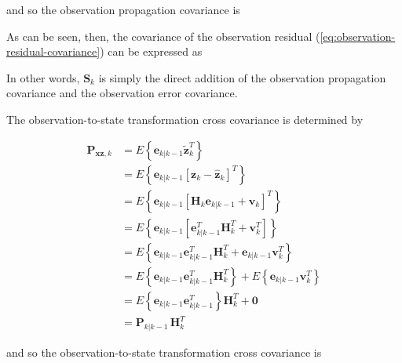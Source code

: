 \documentclass[12pt]{article}
\begin{document}
and so the observation propagation covariance is


As can be seen, then, the covariance of the observation residual (\ref{eq:observation-residual-covariance})
can be expressed as


In other words, $\mathbf{S}_{k}$ is simply the direct addition of the observation
propagation covariance and the observation error covariance.

The observation-to-state transformation cross covariance is determined by

\begin{equation*}
    \begin{aligned}
        \mathbf{P}_{\mathbf{xz},k} &= E \left\{ \mathbf{e}_{k|k-1} \tilde{\mathbf{z}}_k^T \right\} \\
        &= E \left\{ \mathbf{e}_{k|k-1} \left[ \mathbf{z}_k - \hat{\mathbf{z}}_k \right]^T \right\} \\
        &= E \left\{ \mathbf{e}_{k|k-1} \left[ \mathbf{H}_k \mathbf{e}_{k|k-1} + \mathbf{v}_k \right]^T \right\} \\
        &= E \left\{ \mathbf{e}_{k|k-1} \left[ \mathbf{e}_{k|k-1}^T \mathbf{H}_k^T + \mathbf{v}_k^T \right] \right\} \\
        &= E \left\{ \mathbf{e}_{k|k-1} \mathbf{e}_{k|k-1}^T \mathbf{H}_k^T + \mathbf{e}_{k|k-1} \mathbf{v}_k^T \right\} \\
        &= E \left\{ \mathbf{e}_{k|k-1} \mathbf{e}_{k|k-1}^T \mathbf{H}_k^T \right\} + E \left\{ \mathbf{e}_{k|k-1} \mathbf{v}_k^T \right\} \\
        &= E \left\{ \mathbf{e}_{k|k-1} \mathbf{e}_{k|k-1}^T \right\} \mathbf{H}_k^T + \mathbf{0} \\
        &= \mathbf{P}_{k|k-1} \, \mathbf{H}_{k}^T
    \end{aligned}
\end{equation*}

and so the observation-to-state transformation cross covariance is
\end{document}

